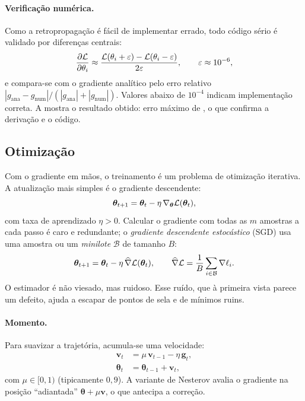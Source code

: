 \paragraph{Verificação numérica.} Como a retropropagação é fácil de implementar errado, todo
código sério é validado por diferenças centrais:
\begin{equation}
	\frac{\partial \mathcal{L}}{\partial \theta_i} \approx
	\frac{\mathcal{L}(\theta_i+\varepsilon) - \mathcal{L}(\theta_i-\varepsilon)}{2\varepsilon},
	\qquad \varepsilon \approx 10^{-6},
	\label{eq:gradcheck}
\end{equation}
e compara-se com o gradiente analítico pelo erro relativo
$\left|g_{\text{ana}} - g_{\text{num}}\right| / \left(\left|g_{\text{ana}}\right| + \left|g_{\text{num}}\right|\right)$.
Valores abaixo de $10^{-4}$ indicam implementação correta. A
 mostra o resultado obtido: erro máximo de \erroGrad{}, o que confirma a
derivação e o código.

\subsection{Otimização}
\label{sec:otimizacao}

Com o gradiente em mãos, o treinamento é um problema de otimização iterativa. A atualização mais
simples é o gradiente descendente:
\begin{equation}
	\bm{\theta}_{t+1} = \bm{\theta}_t - \eta\,\nabla_{\bm{\theta}}\mathcal{L}(\bm{\theta}_t),
	\label{eq:gd}
\end{equation}
com taxa de aprendizado $\eta > 0$. Calcular o gradiente com todas as $m$ amostras a cada passo é
caro e redundante; o \emph{gradiente descendente estocástico} (SGD) usa uma amostra ou um
\emph{minilote} $\mathcal{B}$ de tamanho $B$:
\begin{equation}
	\bm{\theta}_{t+1} = \bm{\theta}_t - \eta\,\widehat{\nabla}\mathcal{L}(\bm{\theta}_t),
	\qquad
	\widehat{\nabla}\mathcal{L} = \frac{1}{B}\sum_{i\in\mathcal{B}}\nabla \ell_i.
	\label{eq:sgd}
\end{equation}
O estimador é não viesado, mas ruidoso. Esse ruído, que à primeira vista parece um defeito, ajuda
a escapar de pontos de sela e de mínimos ruins.

\paragraph{Momento.} Para suavizar a trajetória, acumula-se uma velocidade:
\begin{align}
	\bm{v}_{t} &= \mu\,\bm{v}_{t-1} - \eta\,\bm{g}_t, \label{eq:momentum}\\
	\bm{\theta}_{t} &= \bm{\theta}_{t-1} + \bm{v}_{t}, \label{eq:momentum-upd}
\end{align}
com $\mu \in [0,1)$ (tipicamente $0{,}9$). A variante de Nesterov avalia o gradiente na posição
``adiantada'' $\bm{\theta} + \mu\bm{v}$, o que antecipa a correção.


